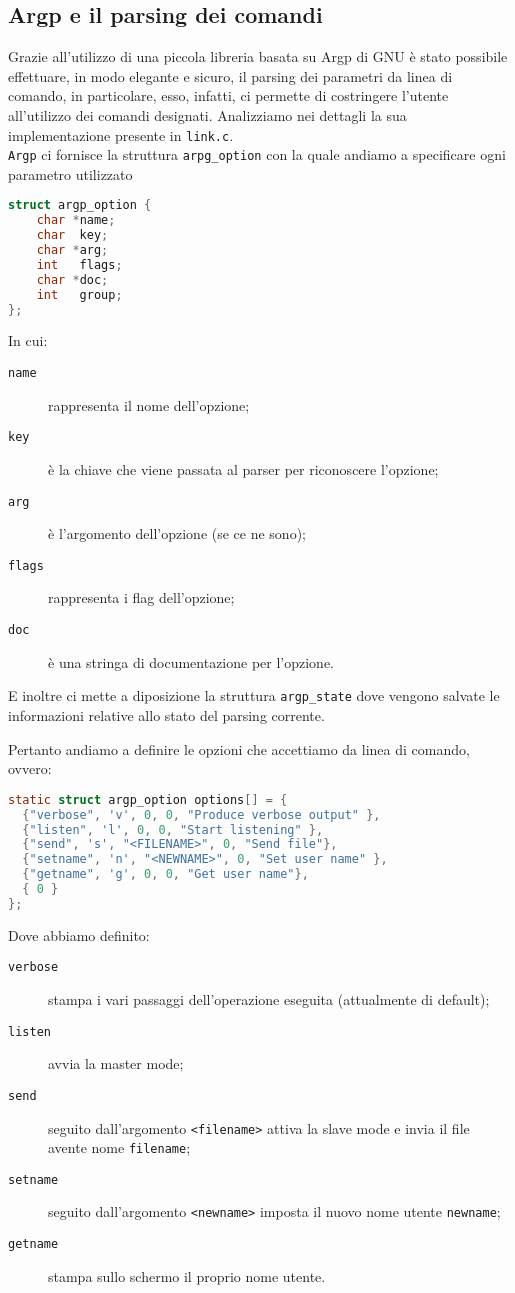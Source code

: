 \documentclass[11pt,fleqn]{book} %
\begin{document}
\subsection{Argp e il parsing dei comandi}
Grazie all'utilizzo di una piccola libreria basata su Argp di GNU  è stato possibile effettuare, in modo elegante e sicuro, il parsing dei parametri da linea di comando, in particolare, esso, infatti, ci permette di costringere l'utente all'utilizzo dei comandi designati. Analizziamo nei dettagli la sua implementazione presente in \texttt{link.c}.\\
\texttt{Argp} ci fornisce la struttura \texttt{arpg\_option} con la quale andiamo a specificare ogni parametro utilizzato
\begin{lstlisting}[language=C]
struct argp_option {
    char *name;
    char  key;
    char *arg;
    int   flags;
    char *doc;
    int   group;    
};
\end{lstlisting}
In cui:
\medskip
\begin{description}
	\item [\texttt{name}] rappresenta il nome dell'opzione;
	\item [\texttt{key}] è la chiave che viene passata al parser per riconoscere l'opzione;
	\item [\texttt{arg}] è l'argomento dell'opzione (se ce ne sono);
	\item [\texttt{flags}] rappresenta i flag dell'opzione;
	\item [\texttt{doc}] è una stringa di documentazione per l'opzione.
\end{description}
\medskip

\noindent E inoltre ci mette a diposizione la struttura \texttt{argp\_state} dove vengono salvate le informazioni relative allo stato del parsing corrente.

\noindent Pertanto andiamo a definire le opzioni che accettiamo da linea di comando, ovvero:
\begin{lstlisting}[language=C]
	static struct argp_option options[] = {
  {"verbose", 'v', 0, 0, "Produce verbose output" },
  {"listen", 'l', 0, 0, "Start listening" },
  {"send", 's', "<FILENAME>", 0, "Send file"},
  {"setname", 'n', "<NEWNAME>", 0, "Set user name" },
  {"getname", 'g', 0, 0, "Get user name"},
  { 0 }
};
\end{lstlisting}
Dove abbiamo definito:
\medskip
\begin{description}
	\item [\texttt{verbose}] stampa i vari passaggi dell'operazione eseguita (attualmente di default);
	\item [\texttt{listen}] avvia la master mode;
	\item [\texttt{send}]  seguito dall'argomento \texttt{<filename>} attiva la slave mode e invia il file avente nome 					\texttt{filename};
	\item [\texttt{setname}] seguito dall'argomento \texttt{<newname>} imposta il nuovo nome utente \texttt{newname};
	\item [\texttt{getname}] stampa sullo schermo il proprio nome utente.
\end{description}
\medskip
\end{document}

